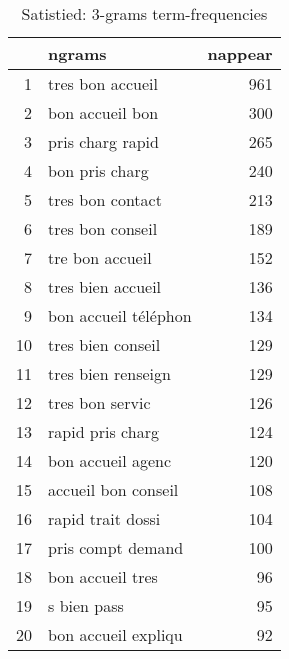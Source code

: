 \begin{table}[ht]
\centering
\begin{tabular}{rlr}
  \hline
 & ngrams & nappear \\ 
  \hline
1 & tres bon accueil & 961 \\ 
  2 & bon accueil bon & 300 \\ 
  3 & pris charg rapid & 265 \\ 
  4 & bon pris charg & 240 \\ 
  5 & tres bon contact & 213 \\ 
  6 & tres bon conseil & 189 \\ 
  7 & tre bon accueil & 152 \\ 
  8 & tres bien accueil & 136 \\ 
  9 & bon accueil téléphon & 134 \\ 
  10 & tres bien conseil & 129 \\ 
  11 & tres bien renseign & 129 \\ 
  12 & tres bon servic & 126 \\ 
  13 & rapid pris charg & 124 \\ 
  14 & bon accueil agenc & 120 \\ 
  15 & accueil bon conseil & 108 \\ 
  16 & rapid trait dossi & 104 \\ 
  17 & pris compt demand & 100 \\ 
  18 & bon accueil tres &  96 \\ 
  19 & s bien pass &  95 \\ 
  20 & bon accueil expliqu &  92 \\ 
   \hline
\end{tabular}
\caption{Satistied: 3-grams term-frequencies} 
\label{tab:tf_sup_3}
\end{table}
